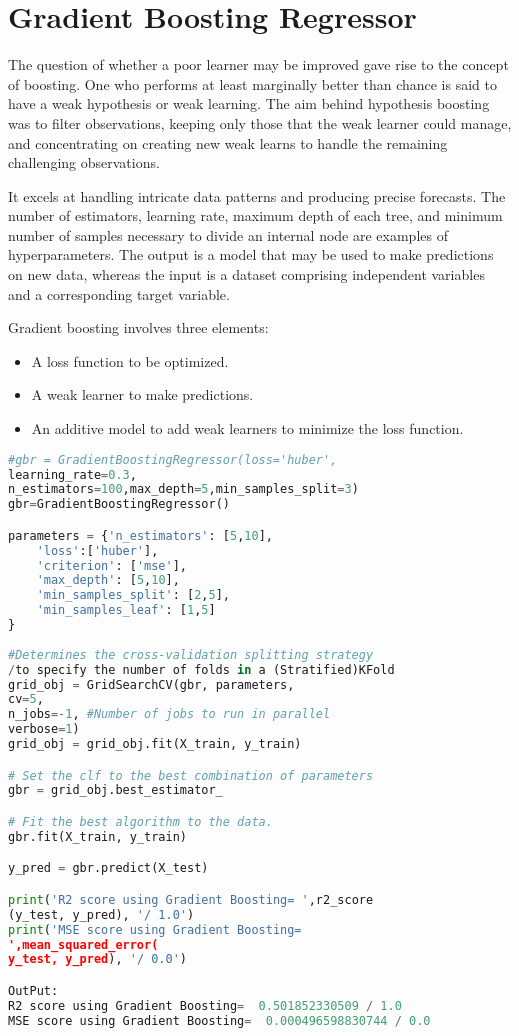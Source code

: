 %
%

\section{Gradient Boosting Regressor}

The question of whether a poor learner may be improved gave rise to the concept of boosting. One who performs at least marginally better than chance is said to have a weak hypothesis or weak learning. The aim behind hypothesis boosting was to filter observations, keeping only those that the weak learner could manage, and concentrating on creating new weak learns to handle the remaining challenging observations.\bigskip

It excels at handling intricate data patterns and producing precise forecasts. The number of estimators, learning rate, maximum depth of each tree, and minimum number of samples necessary to divide an internal node are examples of hyperparameters. The output is a model that may be used to make predictions on new data, whereas the input is a dataset comprising independent variables and a corresponding target variable.\cite{jain:2015} \bigskip

Gradient boosting involves three elements:
\begin{itemize}
\item A loss function to be optimized.
\item A weak learner to make predictions.
\item An additive model to add weak learners to minimize the loss function.
\end{itemize}

\begin{lstlisting}[language=Python]
#gbr = GradientBoostingRegressor(loss='huber',
learning_rate=0.3,
n_estimators=100,max_depth=5,min_samples_split=3)
gbr=GradientBoostingRegressor()

parameters = {'n_estimators': [5,10],
	'loss':['huber'],
	'criterion': ['mse'],
	'max_depth': [5,10], 
	'min_samples_split': [2,5],
	'min_samples_leaf': [1,5]
}
	
#Determines the cross-validation splitting strategy 
/to specify the number of folds in a (Stratified)KFold
grid_obj = GridSearchCV(gbr, parameters,
cv=5, 
n_jobs=-1, #Number of jobs to run in parallel
verbose=1)
grid_obj = grid_obj.fit(X_train, y_train)

# Set the clf to the best combination of parameters
gbr = grid_obj.best_estimator_

# Fit the best algorithm to the data. 
gbr.fit(X_train, y_train)

y_pred = gbr.predict(X_test)

print('R2 score using Gradient Boosting= ',r2_score
(y_test, y_pred), '/ 1.0')
print('MSE score using Gradient Boosting= 
',mean_squared_error(
y_test, y_pred), '/ 0.0')

OutPut:
R2 score using Gradient Boosting=  0.501852330509 / 1.0
MSE score using Gradient Boosting=  0.000496598830744 / 0.0
\end{lstlisting}

